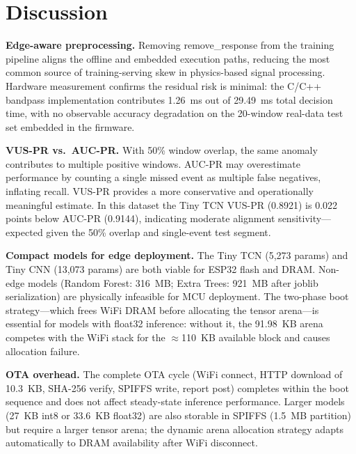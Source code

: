 \documentclass[conference]{IEEEtran}
\def\texttt#1{#1}%
\begin{document}
\section{Discussion}
\label{sec:discussion}

\textbf{Edge-aware preprocessing.}
Removing \texttt{remove\_response} from the training pipeline aligns the
offline and embedded execution paths, reducing the most common source of
training-serving skew in physics-based signal processing.
Hardware measurement confirms the residual risk is minimal: the C/C++
bandpass implementation contributes 1.26~ms out of 29.49~ms total
decision time, with no observable accuracy degradation on the 20-window
real-data test set embedded in the firmware.

\textbf{VUS-PR vs.\ AUC-PR.}
With 50\% window overlap, the same anomaly contributes to multiple positive
windows.
AUC-PR may overestimate performance by counting a single missed event as
multiple false negatives, inflating recall.
VUS-PR provides a more conservative and operationally meaningful estimate.
In this dataset the Tiny TCN VUS-PR (0.8921) is 0.022 points below
AUC-PR (0.9144), indicating moderate alignment sensitivity---expected
given the 50\% overlap and single-event test segment.

\textbf{Compact models for edge deployment.}
The Tiny TCN (5{,}273 params) and Tiny CNN (13{,}073 params) are both
viable for ESP32 flash and DRAM.
Non-edge models (Random Forest: 316~MB; Extra Trees: 921~MB after joblib
serialization) are physically infeasible for MCU deployment.
The two-phase boot strategy---which frees WiFi DRAM before allocating the
tensor arena---is essential for models with float32 inference:
without it, the 91.98~KB arena competes with the WiFi stack for the
$\approx$110~KB available block and causes allocation failure.

\textbf{OTA overhead.}
The complete OTA cycle (WiFi connect, HTTP download of 10.3~KB, SHA-256
verify, SPIFFS write, report post) completes within the boot sequence and
does not affect steady-state inference performance.
Larger models (27~KB int8 or 33.6~KB float32) are also storable in SPIFFS
(1.5~MB partition) but require a larger tensor arena; the dynamic arena
allocation strategy adapts automatically to DRAM availability after WiFi
disconnect.

\end{document}
